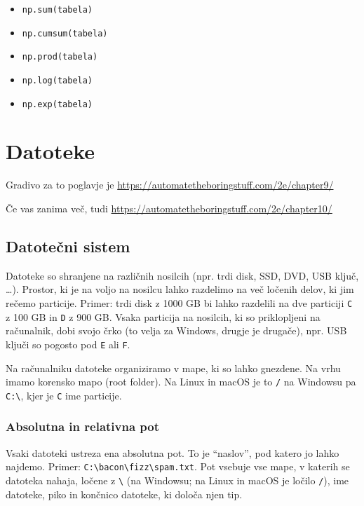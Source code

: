 \documentclass[
]{report}
\providecommand{\tightlist}{%
  \setlength{\itemsep}{0pt}\setlength{\parskip}{0pt}}
\begin{document}
\begin{itemize}
\tightlist
\item
  \texttt{np.sum(tabela)}
\item
  \texttt{np.cumsum(tabela)}
\item
  \texttt{np.prod(tabela)}
\item
  \texttt{np.log(tabela)}
\item
  \texttt{np.exp(tabela)}
\end{itemize}

\hypertarget{datoteke}{%
\chapter{Datoteke}\label{datoteke}}

Gradivo za to poglavje je \url{https://automatetheboringstuff.com/2e/chapter9/}

Če vas zanima več, tudi \url{https://automatetheboringstuff.com/2e/chapter10/}

\hypertarget{datoteux10dni-sistem}{%
\section{Datotečni sistem}\label{datoteux10dni-sistem}}

Datoteke so shranjene na različnih nosilcih (npr. trdi disk, SSD, DVD, USB ključ, \ldots). Prostor, ki je na voljo na nosilcu lahko razdelimo
na več ločenih delov, ki jim rečemo particije. Primer: trdi disk z
1000 GB bi lahko razdelili na dve particiji \texttt{C} z 100 GB in \texttt{D} z 900 GB. Vsaka
particija na nosilcih, ki so priklopljeni na računalnik, dobi svojo črko
(to velja za Windows, drugje je drugače), npr.
USB ključi so pogosto pod \texttt{E} ali \texttt{F}.

Na računalniku datoteke organiziramo v mape, ki so lahko gnezdene. Na vrhu
imamo korensko mapo (root folder). Na Linux in macOS je to \texttt{/} na Windowsu pa
\texttt{C:\textbackslash{}}, kjer je \texttt{C} ime particije.

\hypertarget{absolutna-in-relativna-pot}{%
\subsection{Absolutna in relativna pot}\label{absolutna-in-relativna-pot}}

Vsaki datoteki ustreza ena absolutna pot. To je ``naslov'', pod katero jo lahko najdemo. Primer: \texttt{C:\textbackslash{}bacon\textbackslash{}fizz\textbackslash{}spam.txt}. Pot vsebuje vse mape, v katerih se datoteka nahaja, ločene z \texttt{\textbackslash{}} (na Windowsu; na Linux in macOS je ločilo \texttt{/}), ime datoteke, piko in končnico datoteke, ki določa njen tip.
\end{document}
